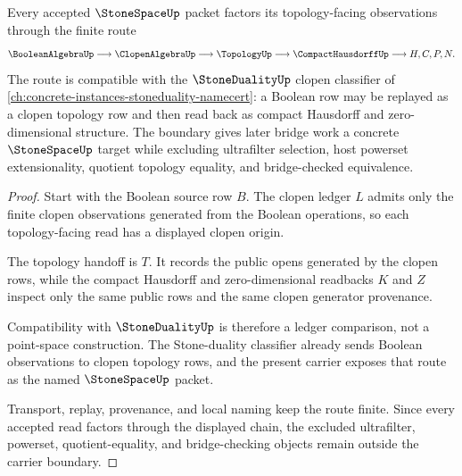 \begin{theorem}
\label{thm:stone-space-clopen-ledger-boundary}
Every accepted $\StoneSpaceUp$ packet factors its topology-facing observations through the finite route
$$
\BooleanAlgebraUp
\longrightarrow
\ClopenAlgebraUp
\longrightarrow
\TopologyUp
\longrightarrow
\CompactHausdorffUp
\longrightarrow
H,C,P,N .
$$
The route is compatible with the $\StoneDualityUp$ clopen classifier of \autoref{ch:concrete-instances-stoneduality-namecert}: a Boolean row may be replayed as a clopen topology row and then read back as compact Hausdorff and zero-dimensional structure. The boundary gives later bridge work a concrete $\StoneSpaceUp$ target while excluding ultrafilter selection, host powerset extensionality, quotient topology equality, and bridge-checked equivalence.
\end{theorem}
\begin{proof}
Start with the Boolean source row $B$. The clopen ledger $L$ admits only the finite clopen observations generated from the Boolean operations, so each topology-facing read has a displayed clopen origin.

The topology handoff is $T$. It records the public opens generated by the clopen rows, while the compact Hausdorff and zero-dimensional readbacks $K$ and $Z$ inspect only the same public rows and the same clopen generator provenance.

Compatibility with $\StoneDualityUp$ is therefore a ledger comparison, not a point-space construction. The Stone-duality classifier already sends Boolean observations to clopen topology rows, and the present carrier exposes that route as the named $\StoneSpaceUp$ packet.

Transport, replay, provenance, and local naming keep the route finite. Since every accepted read factors through the displayed chain, the excluded ultrafilter, powerset, quotient-equality, and bridge-checking objects remain outside the carrier boundary.
\end{proof}


